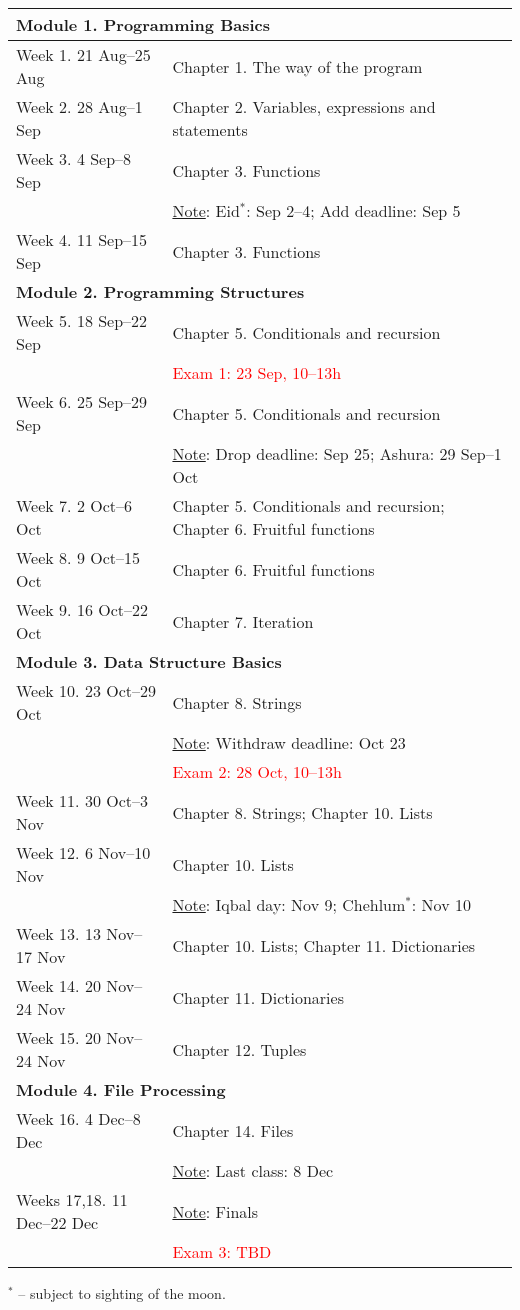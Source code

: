 \documentclass[a4paper]{article}
\begin{document}
\noindent\begin{tabularx}{\textwidth}{lp{}}
  \hline
  \multicolumn{2}{l}{\bf Module 1. Programming Basics}\\\hline
  Week 1. 21 Aug--25 Aug & Chapter 1. The way of the program\\
  Week 2. 28 Aug--1 Sep & Chapter 2. Variables, expressions and statements\\
  Week 3. 4 Sep--8 Sep & Chapter 3. Functions\\
  & \underline{Note}: Eid$^*$: Sep 2--4; Add deadline: Sep 5\\
  Week 4. 11 Sep--15 Sep & Chapter 3. Functions\\\hline
  \multicolumn{2}{l}{\bf Module 2. Programming Structures}\\\hline
  Week 5. 18 Sep--22 Sep & Chapter 5. Conditionals and recursion\\
  & \textcolor{red}{Exam 1: 23 Sep, 10--13h}\\
  Week 6. 25 Sep--29 Sep & Chapter 5. Conditionals and recursion\\
  & \underline{Note}: Drop deadline: Sep 25; Ashura: 29 Sep--1 Oct\\
  Week 7. 2 Oct--6 Oct & Chapter 5. Conditionals and recursion; Chapter 6. Fruitful functions\\
  Week 8. 9 Oct--15 Oct & Chapter 6. Fruitful functions\\
  Week 9. 16 Oct--22 Oct & Chapter 7. Iteration\\\hline
  \multicolumn{2}{l}{\bf Module 3. Data Structure Basics}\\\hline
  Week 10. 23 Oct--29 Oct & Chapter 8. Strings\\
  & \underline{Note}: Withdraw deadline: Oct 23\\
  & \textcolor{red}{Exam 2: 28 Oct, 10--13h}\\
  Week 11. 30 Oct--3 Nov & Chapter 8. Strings; Chapter 10. Lists\\
  Week 12. 6 Nov--10 Nov & Chapter 10. Lists\\
  & \underline{Note}: Iqbal day: Nov 9; Chehlum$^*$: Nov 10\\
  Week 13. 13 Nov--17 Nov & Chapter 10. Lists; Chapter 11. Dictionaries\\
  Week 14. 20 Nov--24 Nov & Chapter 11. Dictionaries \\ 
  Week 15. 20 Nov--24 Nov & Chapter 12. Tuples\\\hline
  \multicolumn{2}{l}{\bf Module 4. File Processing}\\\hline
  Week 16. 4 Dec--8 Dec & Chapter 14. Files\\
  & \underline{Note}: Last class: 8 Dec\\
  Weeks 17,18. 11 Dec--22 Dec & \underline{Note}: Finals \\
  & \textcolor{red}{Exam 3: TBD}\\\hline
\end{tabularx}
$^*$ -- subject to sighting of the moon.
\end{document}
